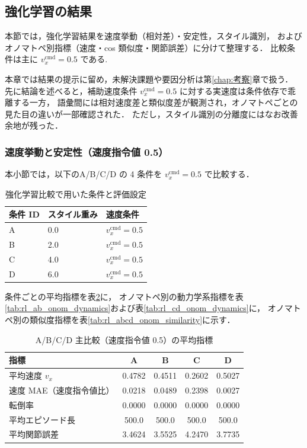 \subsection{強化学習の結果}
\label{subsec:rl_results}

\noindent 本節では，強化学習結果を速度挙動（相対差）・安定性，スタイル識別，
およびオノマトペ別指標（速度・cos 類似度・関節誤差）に分けて整理する．
比較条件は主に $v_x^{\mathrm{cmd}}=0.5$ である.

本章では結果の提示に留め，未解決課題や要因分析は第\ref{chap:考察}章で扱う．
先に結論を述べると，補助速度条件 $v_x^{\mathrm{cmd}}=0.5$ に対する実速度は条件依存で乖離する一方，
語彙間には相対速度差と類似度差が観測され，オノマトペごとの見た目の違いが一部確認された．
ただし，スタイル識別の分離度にはなお改善余地が残った．

\subsubsection{速度挙動と安定性（速度指令値 0.5）}
\label{subsubsec:rl_results_20260201}

本小節では，以下のA/B/C/D の 4 条件を
$v_x^{\mathrm{cmd}}=0.5$ で比較する．

\begin{table}[htb]
  \centering
  \caption{強化学習比較で用いた条件と評価設定}
  \label{tab:rl_comparison_runs}
  \small
  \begin{tabular}{lll} \toprule
    \textbf{条件 ID} & \textbf{スタイル重み} & \textbf{速度条件} \\ \midrule
    A & 0.0 & $v_x^{\mathrm{cmd}}=0.5$ \\
    B & 2.0 & $v_x^{\mathrm{cmd}}=0.5$ \\
    C & 4.0 & $v_x^{\mathrm{cmd}}=0.5$ \\
    D & 6.0 & $v_x^{\mathrm{cmd}}=0.5$ \\
    \bottomrule
  \end{tabular}
\end{table}


条件ごとの平均指標を表\ref{tab:rl_abcd_main_m2999}に，
オノマトペ別の動力学系指標を表\ref{tab:rl_ab_onom_dynamics}および表\ref{tab:rl_cd_onom_dynamics}に，
オノマトペ別の類似度指標を表\ref{tab:rl_abcd_onom_similarity}に示す．

\begin{table}[H]
  \centering
  \caption{A/B/C/D 主比較（速度指令値 0.5）の平均指標}
  \label{tab:rl_abcd_main_m2999}
  \begin{tabular}{lcccc} \toprule
    \textbf{指標} & \textbf{A} & \textbf{B} & \textbf{C} & \textbf{D} \\ \midrule
    平均速度 $v_x$ & 0.4782 & 0.4511 & 0.2602 & 0.5027 \\
    速度 MAE（速度指令値比） & 0.0218 & 0.0489 & 0.2398 & 0.0027 \\
    転倒率 & 0.0000 & 0.0000 & 0.0000 & 0.0000 \\
    平均エピソード長 & 500.0 & 500.0 & 500.0 & 500.0 \\
    平均関節誤差 & 3.4624 & 3.5525 & 4.2470 & 3.7735 \\
    \bottomrule
  \end{tabular}
\end{table}

